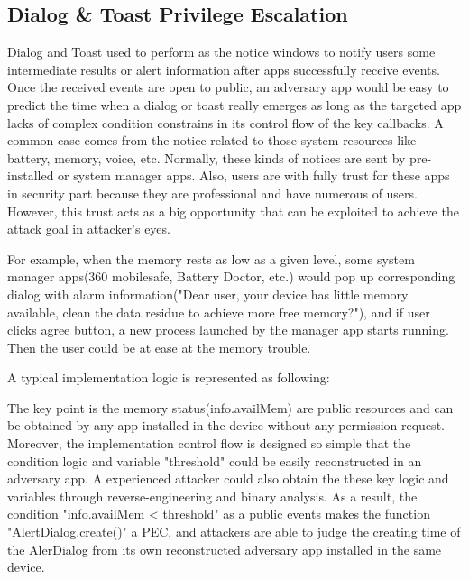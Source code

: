\documentclass{sig-alternate-05-2015}
\begin{document}
\subsection{Dialog \& Toast Privilege Escalation}
Dialog and Toast used to perform as the notice windows to notify users some intermediate results or alert information  after apps successfully receive events. Once the received events are open to public, an adversary app would be easy to predict the time when a dialog or toast really emerges as long as the targeted app lacks of complex condition constrains in its control flow of the key callbacks. A common case comes from the notice related to those system resources like battery, memory, voice, etc. Normally, these kinds of notices are sent by pre-installed or system manager apps. Also, users are with fully trust for these apps in security part because they are professional and have numerous of users. However, this trust acts as a big opportunity that can be exploited to achieve the attack goal in attacker's eyes.

For example, when the memory rests as low as a given level, some system manager apps(360 mobilesafe, Battery Doctor, etc.) would pop up corresponding dialog with alarm information("Dear user, your device has little memory available, clean the data residue to achieve more free memory?"), and if user clicks agree button, a new process launched by the manager app starts running. Then the user could be at ease at the memory trouble.

A typical implementation logic is represented as following:

The key point is the memory status(info.availMem) are public resources and can be obtained by any app installed in the device without any permission request. Moreover, the implementation control flow is designed so simple that 
the condition logic and variable "threshold" could be easily reconstructed in an adversary app. A experienced attacker could also obtain the these key logic and variables through reverse-engineering and binary analysis. As a result, the condition "info.availMem < threshold" as a public events makes the function "AlertDialog.create()" a PEC, and attackers are able to judge the creating time of the AlerDialog from its own reconstructed adversary app installed in the same device.
\end{document}
